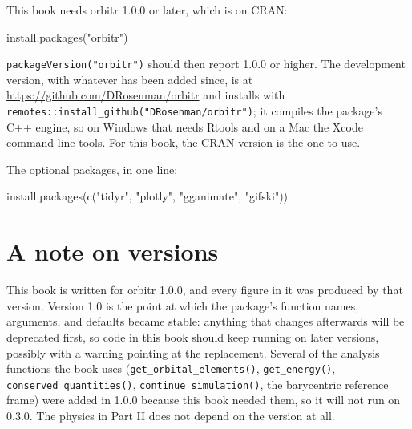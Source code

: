 \documentclass[
  10.5pt,
  letterpaper,
]{scrbook}
\newenvironment{Shaded}{\begin{snugshade}}{\end{snugshade}}
\newcommand{\FunctionTok}[1]{\textcolor[rgb]{0.00,0.00,0.00}{#1}}
\newcommand{\NormalTok}[1]{\textcolor[rgb]{0.00,0.00,0.00}{#1}}
\newcommand{\StringTok}[1]{\textcolor[rgb]{0.00,0.00,0.00}{#1}}
\theoremstyle{plain}
\theoremstyle{remark}
\begin{document}
\begin{tcolorbox}[enhanced jigsaw, arc=.35mm, bottomrule=.15mm, bottomtitle=1mm, breakable, colback=white, colbacktitle=quarto-callout-note-color!10!white, colframe=quarto-callout-note-color-frame, coltitle=black, left=2mm, leftrule=.75mm, opacityback=0, opacitybacktitle=0.6, rightrule=.15mm, title={Installing orbitr}, titlerule=0mm, toprule=.15mm, toptitle=1mm]

This book needs orbitr 1.0.0 or later, which is on CRAN:

\begin{Shaded}
\begin{Highlighting}[]
\FunctionTok{install.packages}\NormalTok{(}\StringTok{"orbitr"}\NormalTok{)}
\end{Highlighting}
\end{Shaded}

\texttt{packageVersion("orbitr")} should then report 1.0.0 or higher.
The development version, with whatever has been added since, is at
\url{https://github.com/DRosenman/orbitr} and installs with
\texttt{remotes::install\_github("DRosenman/orbitr")}; it compiles the
package's C++ engine, so on Windows that needs Rtools and on a Mac the
Xcode command-line tools. For this book, the CRAN version is the one to
use.

\end{tcolorbox}

The optional packages, in one line:

\begin{Shaded}
\begin{Highlighting}[]
\FunctionTok{install.packages}\NormalTok{(}\FunctionTok{c}\NormalTok{(}\StringTok{"tidyr"}\NormalTok{, }\StringTok{"plotly"}\NormalTok{, }\StringTok{"gganimate"}\NormalTok{, }\StringTok{"gifski"}\NormalTok{))}
\end{Highlighting}
\end{Shaded}

\section*{A note on versions}\label{a-note-on-versions}


This book is written for orbitr 1.0.0, and every figure in it was
produced by that version. Version 1.0 is the point at which the
package's function names, arguments, and defaults became stable:
anything that changes afterwards will be deprecated first, so code in
this book should keep running on later versions, possibly with a warning
pointing at the replacement. Several of the analysis functions the book
uses (\texttt{get\_orbital\_elements()}, \texttt{get\_energy()},
\texttt{conserved\_quantities()}, \texttt{continue\_simulation()}, the
barycentric reference frame) were added in 1.0.0 because this book
needed them, so it will not run on 0.3.0. The physics in Part II does
not depend on the version at all.
\end{document}
